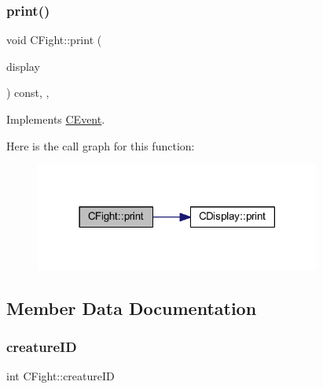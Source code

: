 \subsubsection{\texorpdfstring{print()}{print()}}
{\footnotesize\ttfamily void C\+Fight\+::print (\begin{DoxyParamCaption}\item[{const \mbox{\hyperlink{class_c_display}{C\+Display}} \&}]{display }\end{DoxyParamCaption}) const\hspace{0.3cm}{\ttfamily [inline]}, {\ttfamily [override]}, {\ttfamily [virtual]}}



Implements \mbox{\hyperlink{class_c_event_ad6f75aa0babcd74caff9426cecdd86f0}{C\+Event}}.

Here is the call graph for this function\+:\nopagebreak
\begin{figure}[H]
\begin{center}
\leavevmode
\includegraphics[width=266pt]{class_c_fight_a70c350b815744b481134b4d3ac0f61bb_cgraph}
\end{center}
\end{figure}


\subsection{Member Data Documentation}
\mbox{\label{class_c_fight_a986de57fedf8056ccec818146406efd2}} 
\subsubsection{\texorpdfstring{creature\+ID}{creatureID}}
{\footnotesize\ttfamily int C\+Fight\+::creature\+ID\hspace{0.3cm}{\ttfamily [protected]}}

\mbox{\label{class_c_fight_ae7e8bdccd47c1064a04668ab1d6af255}} 
